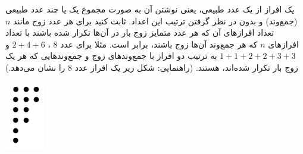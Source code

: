 \EXERCISE
یک افراز از یک عدد طبیعی، یعنی نوشتن آن به صورت مجموع یک یا چند عدد طبیعی (جمع‌وند) و بدون در نظر گرفتن ترتیب این اعداد. ثابت کنید برای هر عدد زوج مانند
$n$
تعداد افرازهای آن که هر عدد متمایز زوج بار در آن‌ها تکرار شده باشند با تعداد افرازهای
$n$
که هر جمع‌وند آن‌ها زوج باشند، برابر است. مثلا برای عدد
$8$
،
$2 + 4 + 6$
و
$1 + 1 + 2 + 2 + 3 + 3$
به ترتیب دو افراز با جمع‌وندهای زوج و جمع‌وندهایی که هر یک زوج بار تکرار شده‌اند، هستند. (راهنمایی: شکل زیر یک افراز عدد
$8$
را نشان می‌دهد.)
\begin{center}
\includegraphics[height=3cm]{10.png}
\end{center}
